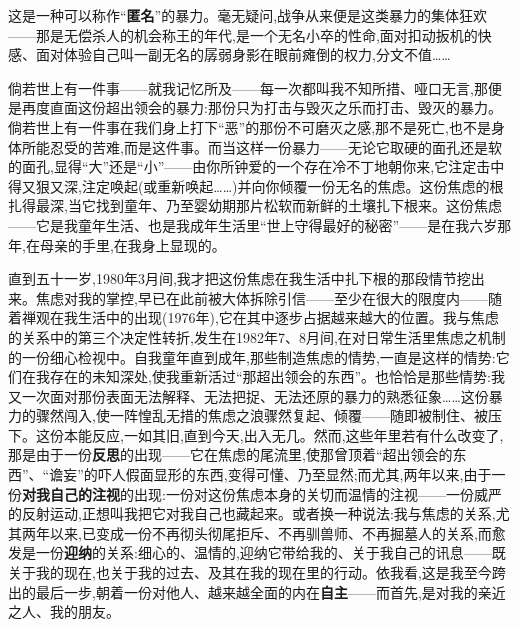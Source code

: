 这是一种可以称作“\textbf{匿名}”的暴力。毫无疑问,战争从来便是这类暴力的集体狂欢——那是无偿杀人的机会称王的年代,是一个无名小卒的性命,面对扣动扳机的快感、面对体验自己叫一副无名的孱弱身影在眼前瘫倒的权力,分文不值……

倘若世上有一件事——就我记忆所及——每一次都叫我不知所措、哑口无言,那便是再度直面这份超出领会的暴力:那份只为打击与毁灭之乐而打击、毁灭的暴力。倘若世上有一件事在我们身上打下“恶”的那份不可磨灭之感,那不是死亡,也不是身体所能忍受的苦难,而是这件事。而当这样一份暴力——无论它取硬的面孔还是软的面孔,显得“大”还是“小”——由你所钟爱的一个存在冷不丁地朝你来,它注定击中得又狠又深,注定唤起(或重新唤起……)并向你倾覆一份无名的焦虑。这份焦虑的根扎得最深,当它找到童年、乃至婴幼期那片松软而新鲜的土壤扎下根来。这份焦虑——它是我童年生活、也是我成年生活里“世上守得最好的秘密”——是在我六岁那年,在母亲的手里,在我身上显现的。

直到五十一岁,1980年3月间,我才把这份焦虑在我生活中扎下根的那段情节挖出来。焦虑对我的掌控,早已在此前被大体拆除引信——至少在很大的限度内\dmark{}——随着禅观在我生活中的出现(1976年),它在其中逐步占据越来越大的位置。我与焦虑的关系中的第三个决定性转折,发生在1982年7、8月间,在对日常生活里焦虑之机制的一份细心检视中。自我童年直到成年,那些制造焦虑的情势,一直是这样的情势:它们在我存在的未知深处,使我重新活过“那超出领会的东西”。也恰恰是那些情势:我又一次面对那份表面无法解释、无法把捉、无法还原的暴力的熟悉征象……这份暴力的骤然闯入,使一阵惶乱无措的焦虑之浪骤然复起、倾覆——随即被制住、被压下。这份本能反应,一如其旧,直到今天,出入无几。然而,这些年里若有什么改变了,那是由于一份\textbf{反思}的出现——它在焦虑的尾流里,使那曾顶着“超出领会的东西”、“谵妄”的吓人假面显形的东西,变得可懂、乃至显然;而尤其,两年以来,由于一份\textbf{对我自己的注视}的出现:一份对这份焦虑本身的关切而温情的注视——一份威严的反射运动,正想叫我把它对我自己也藏起来。或者换一种说法:我与焦虑的关系,尤其两年以来,已变成一份不再彻头彻尾拒斥、不再驯兽师、不再掘墓人的关系,而愈发是一份\textbf{迎纳}的关系:细心的、温情的,迎纳它带给我的、关于我自己的讯息——既关于我的现在,也关于我的过去、及其在我的现在里的行动。依我看,这是我至今跨出的最后一步,朝着一份对他人、越来越全面的内在\textbf{自主}——而首先,是对我的亲近之人、我的朋友。

